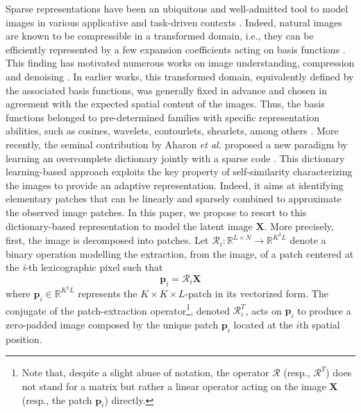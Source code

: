 \documentclass[review]{elsarticle}
\newcommand{\Ndim}{L}
\newcommand{\Psize}{K}
\begin{document}
Sparse representations have been an ubiquitous and well-admitted tool to model images in various applicative and task-driven contexts \citep{mairal_sparse_2014}. Indeed, natural images are known to be compressible in a transformed domain, i.e., they can be efficiently represented by a few expansion coefficients acting on basis functions  \citep{mallat_wavelet_2009}. This finding has motivated numerous works on image understanding, compression and denoising \citep{olshausen_sparse_1997,chen_atomic_2001}. In earlier works, this transformed domain, equivalently defined by the associated basis functions, was generally fixed in advance and chosen in agreement with the expected spatial content of the images. Thus, the basis functions belonged to pre-determined families with specific representation abilities, such as cosines, wavelets, contourlets, shearlets, among others  \citep{mallat_wavelet_2009}. More recently, the seminal contribution by Aharon \emph{et al.} proposed a new paradigm by learning an overcomplete dictionary jointly with a sparse code \citep{aharon_k-svd_2006}. This dictionary learning-based approach exploits the key property of self-similarity characterizing the images to provide an adaptive representation. Indeed, it aims at identifying elementary patches that can be linearly and sparsely combined to approximate the observed image patches. In this paper, we propose to resort to this dictionary-based representation to model the latent image $\mathbf{X}$. More precisely, first, the image is decomposed into patches. %
Let $\mathcal{R}_{i} : \mathbb{R}^{\Ndim \times N} \rightarrow \mathbb{R}^{\Psize^{2}\Ndim}$ denote a binary operation modelling the extraction, from the image, of a patch centered at the \textit{i}-th lexicographic pixel such that
\begin{equation}
\label{eq:patch_extraction}
\mathbf{p}_{i} = \mathcal{R}_{i}\mathbf{X}
\end{equation}
where $\mathbf{p}_{i} \in \mathbb{R}^{\Psize^{2}\Ndim}$ represents the $\Psize \times \Psize \times \Ndim$-patch in its vectorized form. The conjugate of the patch-extraction operator\footnote{Note that, despite a slight abuse of notation, the operator $\mathcal{R}$ (resp., $\mathcal{R}^T$) does not stand for a matrix but rather a linear operator acting on the image $\mathbf{X}$ (resp., the patch $\mathbf{p}_{i}$) directly.}, denoted $\mathcal{R}^{T}_{i}$, acts on $\mathbf{p}_{i}$ to produce a zero-padded image composed by the unique patch $\mathbf{p}_{i}$ located at the $i$th spatial position.
\end{document}
